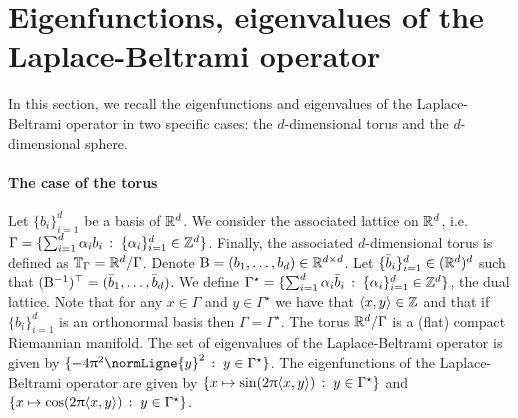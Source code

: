 \section{Eigenfunctions, eigenvalues of the Laplace-Beltrami operator}
\label{sec:eigenf-eigenv-lapl}


In this section, we recall the eigenfunctions and eigenvalues of the
Laplace-Beltrami operator in two specific cases: the $d$-dimensional torus and
the $d$-dimensional sphere.

\paragraph{The case of the torus}
Let $\{b_i\}_{i=1}^d$ be a basis of $\mathbb{R}^d$.  We consider the associated
lattice on $\mathbb{R}^d$, i.e.
$\Gamma = \{\sum_{i=1}^d \alpha_i b_i\,:\; \{\alpha_i\}_{i=1}^d \in
  \mathbb{Z}^d\}$. Finally, the associated $d$-dimensional torus is defined as
$\mathbb{T}_\Gamma = \mathbb{R}^d / \Gamma$. Denote
$\mathrm{B} = (b_1, \dots, b_d) \in \mathbb{R}^{d \times d}$. Let
$\{\bar{b}_i\}_{i=1}^d \in (\mathbb{R}^d)^d$ such that
$(\mathrm{B}^{-1})^\top = (\bar{b}_1, \dots, \bar{b}_d)$. We define
$\Gamma^\star = \{\sum_{i=1}^d \alpha_i
  \bar{b}_i\,:\; \{\alpha_i\}_{i=1}^d \in \mathbb{Z}^d\}$, the dual lattice. Note that for
any $x \in \Gamma$ and $y \in \Gamma^\star$ we have that
$\langle x, y \rangle \in \mathbb{Z}$ and that if $\{b_i\}_{i=1}^d$ is an orthonormal
basis then $\Gamma = \Gamma^\star$. The torus $\mathbb{R}^d/\Gamma$ is a (flat)
compact Riemannian manifold. The set of eigenvalues of the Laplace-Beltrami
operator is given by
$\ensembleLigne{-4 \uppi^2 \normLigne{y}^2}{y \in \Gamma^\star}$. The
eigenfunctions of the Laplace-Beltrami operator are given by
$\{x \mapsto \sin(2 \uppi \langle x, y \rangle)\,:\; y \in
  \Gamma^\star\}$ and
$\{x \mapsto \cos(2 \uppi \langle x, y \rangle)\,:\; y \in
  \Gamma^\star\}$. 


